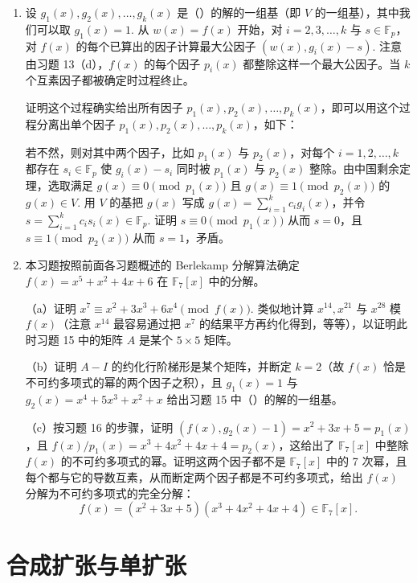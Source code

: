 \begin{enumerate}
\item 设 \(g_1(x), g_2(x), \ldots, g_k(x)\) 是（\*\*）的解的一组基（即 \(V\) 的一组基），其中我们可以取 \(g_1(x) = 1\). 从 \(w(x) = f(x)\) 开始，对 \(i = 2, 3, \ldots, k\) 与 \(s \in \mathbb{F}_p\)，对 \(f(x)\) 的每个已算出的因子计算最大公因子 \((w(x), g_i(x)-s)\). 注意由习题 13（d），\(f(x)\) 的每个因子 \(p_i(x)\) 都整除这样一个最大公因子。当 \(k\) 个互素因子都被确定时过程终止。

证明这个过程确实给出所有因子 \(p_1(x), p_2(x), \ldots, p_k(x)\)，即可以用这个过程分离出单个因子 \(p_1(x), p_2(x), \ldots, p_k(x)\)，如下：

若不然，则对其中两个因子，比如 \(p_1(x)\) 与 \(p_2(x)\)，对每个 \(i = 1, 2, \ldots, k\) 都存在 \(s_i \in \mathbb{F}_p\) 使 \(g_i(x)-s_i\) 同时被 \(p_1(x)\) 与 \(p_2(x)\) 整除。由中国剩余定理，选取满足 \(g(x) \equiv 0 \pmod{p_1(x)}\) 且 \(g(x) \equiv 1 \pmod{p_2(x)}\) 的 \(g(x) \in V\). 用 \(V\) 的基把 \(g(x)\) 写成 \(g(x) = \sum_{i=1}^k c_ig_i(x)\)，并令 \(s = \sum_{i=1}^kc_is_i(x) \in \mathbb{F}_p\). 证明 \(s \equiv 0 \pmod{p_1(x)}\) 从而 \(s = 0\)，且 \(s \equiv 1 \pmod{p_2(x)}\) 从而 \(s = 1\)，矛盾。

\item 本习题按照前面各习题概述的 Berlekamp 分解算法确定 \(f(x) = x^5+x^2+4x+6\) 在 \(\mathbb{F}_7[x]\) 中的分解。

（a）证明 \(x^7 \equiv x^2+3x^3+6x^4 \pmod{f(x)}\). 类似地计算 \(x^{14}, x^{21}\) 与 \(x^{28}\) 模 \(f(x)\)（注意 \(x^{14}\) 最容易通过把 \(x^7\) 的结果平方再约化得到，等等），以证明此时习题 15 中的矩阵 \(A\) 是某个 \(5 \times 5\) 矩阵。

（b）证明 \(A-I\) 的约化行阶梯形是某个矩阵，并断定 \(k = 2\)（故 \(f(x)\) 恰是不可约多项式的幂的两个因子之积），且 \(g_1(x) = 1\) 与 \(g_2(x) = x^4+5x^3+x^2+x\) 给出习题 15 中（\*\*）的解的一组基。

（c）按习题 16 的步骤，证明 \((f(x), g_2(x)-1) = x^2+3x+5 = p_1(x)\)，且 \(f(x)/p_1(x) = x^3+4x^2+4x+4 = p_2(x)\)，这给出了 \(\mathbb{F}_7[x]\) 中整除 \(f(x)\) 的不可约多项式的幂。证明这两个因子都不是 \(\mathbb{F}_7[x]\) 中的 7 次幂，且每个都与它的导数互素，从而断定两个因子都是不可约多项式，给出 \(f(x)\) 分解为不可约多项式的完全分解：
\[
f(x) = (x^2+3x+5)(x^3+4x^2+4x+4) \in \mathbb{F}_7[x].
\]
\end{enumerate}

\section{合成扩张与单扩张}

